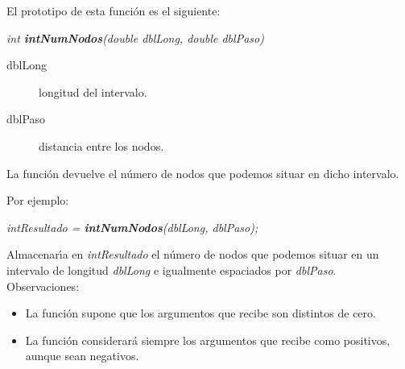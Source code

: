 El prototipo de esta funci\'on es el siguiente:

\begin{center}
\emph{int \textbf{intNumNodos}(double dblLong, double dblPaso)}
\end{center}

\begin{description}
\item[dblLong] longitud del intervalo.
\item[dblPaso] distancia entre los nodos.
\end{description}

La funci\'on devuelve el n\'umero de nodos que podemos situar en dicho
intervalo.\newline

Por ejemplo:

\begin{center}
\emph{intResultado = \textbf{intNumNodos}(dblLong, dblPaso);}
\end{center}

Almacenar\'{\i}a en \emph{intResultado} el n\'umero de nodos que podemos 
situar en un intervalo de longitud \emph{dblLong} e igualmente espaciados
por \emph{dblPaso}.\\

Observaciones:

\begin{itemize}
\item La funci\'on supone que los argumentos que recibe son distintos de cero.
\item La funci\'on considerar\'a siempre los argumentos que recibe como
positivos, aunque sean negativos.
\end{itemize}



